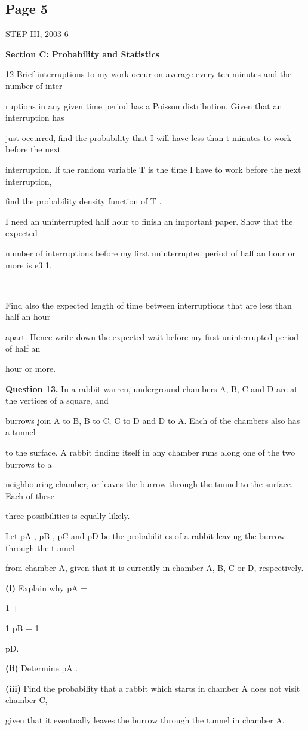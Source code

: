 \documentclass[12pt]{article}
\begin{document}
\subsection*{Page 5}
\begin{flushleft}
STEP III, 2003 6\par
\bigskip\textbf{Section C: Probability and Statistics}\par
12 Brief interruptions to my work occur on average every ten minutes and the number of inter-\par
ruptions in any given time period has a Poisson distribution. Given that an interruption has\par
just occurred, find the probability that I will have less than t minutes to work before the next\par
interruption. If the random variable T is the time I have to work before the next interruption,\par
find the probability density function of T .\par
I need an uninterrupted half hour to finish an important paper. Show that the expected\par
number of interruptions before my first uninterrupted period of half an hour or more is e3 1.\par
-\par
Find also the expected length of time between interruptions that are less than half an hour\par
apart. Hence write down the expected wait before my first uninterrupted period of half an\par
hour or more.\par
\bigskip\textbf{Question 13.} In a rabbit warren, underground chambers A, B, C and D are at the vertices of a square, and\par
burrows join A to B, B to C, C to D and D to A. Each of the chambers also has a tunnel\par
to the surface. A rabbit finding itself in any chamber runs along one of the two burrows to a\par
neighbouring chamber, or leaves the burrow through the tunnel to the surface. Each of these\par
three possibilities is equally likely.\par
Let pA , pB , pC and pD be the probabilities of a rabbit leaving the burrow through the tunnel\par
from chamber A, given that it is currently in chamber A, B, C or D, respectively.\par
\textbf{(i)} Explain why pA =\par
1 +\par
1 pB + 1\par
pD.\par
\textbf{(ii)} Determine pA .\par
\textbf{(iii)} Find the probability that a rabbit which starts in chamber A does not visit chamber C,\par
given that it eventually leaves the burrow through the tunnel in chamber A.\par
\end{flushleft}
\end{document}
